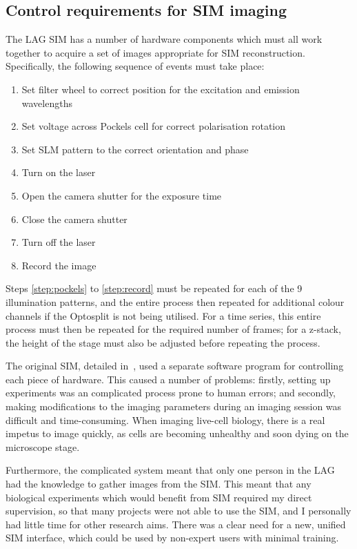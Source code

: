 \subsection{Control requirements for SIM imaging} \label{sec:SIMsteps}
The LAG SIM has a number of hardware components which must all work together to acquire a set of images appropriate for SIM reconstruction.
Specifically, the following sequence of events must take place:
\begin{enumerate}
	\item Set filter wheel to correct position for the excitation and emission wavelengths
	\item\label{step:pockels} Set voltage across Pockels cell for correct polarisation rotation
	\item Set SLM pattern to the correct orientation and phase
	\item Turn on the laser
	\item Open the camera shutter for the exposure time
	\item Close the camera shutter
	\item Turn off the laser
	\item\label{step:record} Record the image
\end{enumerate}
Steps \ref{step:pockels} to \ref{step:record} must be repeated for each of the 9 illumination patterns, and the entire process then repeated for additional colour channels if the Optosplit is not being utilised. 
For a time series, this entire process must then be repeated for the required number of frames; for a z-stack, the height of the stage must also be adjusted before repeating the process. 

The original SIM, detailed in~\cite{young2016guide}, used a separate software program for controlling each piece of hardware. 
This caused a number of problems: firstly, setting up experiments was an complicated process prone to human errors; and secondly, making modifications to the imaging parameters during an imaging session was difficult and time-consuming. 
When imaging live-cell biology, there is a real impetus to image quickly, as cells are becoming unhealthy and soon dying on the microscope stage. 

Furthermore, the complicated system meant that only one person in the LAG had the knowledge to gather images from the SIM. 
This meant that any biological experiments which would benefit from SIM required my direct supervision, so that many projects were not able to use the SIM, and I personally had little time for other research aims.
There was a clear need for a new, unified SIM interface, which could be used by non-expert users with minimal training. 

